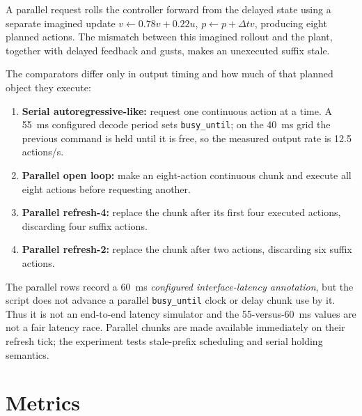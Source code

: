 \documentclass[11pt]{article}
\begin{document}
A parallel request rolls the controller forward from the delayed state using a separate imagined update \(v\leftarrow0.78v+0.22u\), \(p\leftarrow p+\Delta t v\), producing eight planned actions. The mismatch between this imagined rollout and the plant, together with delayed feedback and gusts, makes an unexecuted suffix stale.

The comparators differ only in output timing and how much of that planned object they execute:
\begin{enumerate}[leftmargin=1.5em]
  \item \textbf{Serial autoregressive-like:} request one continuous action at a time. A 55~ms configured decode period sets \texttt{busy\_until}; on the 40~ms grid the previous command is held until it is free, so the measured output rate is 12.5 actions/s.
  \item \textbf{Parallel open loop:} make an eight-action continuous chunk and execute all eight actions before requesting another.
  \item \textbf{Parallel refresh-4:} replace the chunk after its first four executed actions, discarding four suffix actions.
  \item \textbf{Parallel refresh-2:} replace the chunk after two actions, discarding six suffix actions.
\end{enumerate}

The parallel rows record a 60~ms \emph{configured interface-latency annotation}, but the script does not advance a parallel \texttt{busy\_until} clock or delay chunk use by it. Thus it is not an end-to-end latency simulator and the 55-versus-60~ms values are not a fair latency race. Parallel chunks are made available immediately on their refresh tick; the experiment tests stale-prefix scheduling and serial holding semantics.

\section{Metrics}
\end{document}
